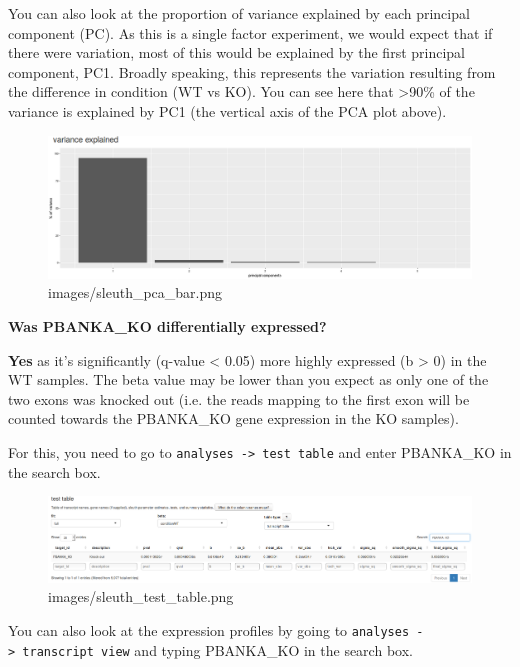 \documentclass[11pt]{article}
\makeatletter
\def\maxwidth{\ifdim\Gin@nat@width>\linewidth\linewidth
    \else\Gin@nat@width\fi}
\let\Oldincludegraphics\includegraphics
\renewcommand{\includegraphics}[1]{\Oldincludegraphics[width=.8\maxwidth, height=.55\textheight, keepaspectratio]{#1}}
\makeatother
\begin{document}
    You can also look at the proportion of variance explained by each
principal component (PC). As this is a single factor experiment, we
would expect that if there were variation, most of this would be
explained by the first principal component, PC1. Broadly speaking, this
represents the variation resulting from the difference in condition (WT
vs KO). You can see here that \textgreater{}90\% of the variance is
explained by PC1 (the vertical axis of the PCA plot above).

    \begin{figure}[!h]
\centering
\includegraphics{images/sleuth_pca_bar.png}
\caption{images/sleuth\_pca\_bar.png}
\end{figure}

    \textbf{Was PBANKA\_KO differentially expressed?}

\textbf{Yes} as it's significantly (q-value \textless{} 0.05) more
highly expressed (b \textgreater{} 0) in the WT samples. The beta value
may be lower than you expect as only one of the two exons was knocked
out (i.e. the reads mapping to the first exon will be counted towards
the PBANKA\_KO gene expression in the KO samples).

For this, you need to go to
\texttt{analyses\ -\textgreater{}\ test\ table} and enter PBANKA\_KO in
the search box.

    \begin{figure}[!h]
\centering
\includegraphics{images/sleuth_test_table.png}
\caption{images/sleuth\_test\_table.png}
\end{figure}

    You can also look at the expression profiles by going to
\texttt{analyses\ -\textgreater{}\ transcript\ view} and typing
PBANKA\_KO in the search box.
\end{document}
